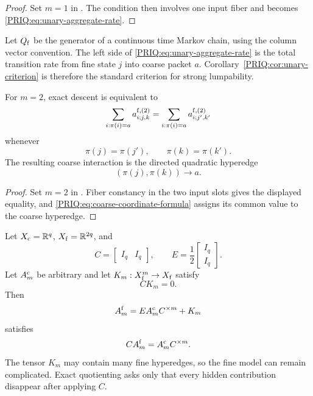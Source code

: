 \begin{proof}
Set $m=1$ in .  The condition then involves one input fiber and becomes \eqref{PRIQ:eq:unary-aggregate-rate}.
\end{proof}

Let $Q_{\mathrm f}$ be the generator of a continuous time Markov chain, using the column vector convention.  The left side of \eqref{PRIQ:eq:unary-aggregate-rate} is the total transition rate from fine state $j$ into coarse packet $a$.  Corollary~\ref{PRIQ:cor:unary-criterion} is therefore the standard criterion for strong lumpability.

\begin{PRIQcorollary}\label{PRIQ:cor:quadratic-criterion}
For $m=2$, exact descent is equivalent to
\[
  \sum_{i:\pi(i)=a}a^{\mathrm f,(2)}_{i;j,k}
  =
  \sum_{i:\pi(i)=a}a^{\mathrm f,(2)}_{i;j',k'}
\]
whenever
\[
  \pi(j)=\pi(j'),
  \qquad
  \pi(k)=\pi(k').
\]
The resulting coarse interaction is the directed quadratic hyperedge
\[
  (\pi(j),\pi(k))\longrightarrow a.
\]
\end{PRIQcorollary}

\begin{proof}
Set $m=2$ in .  Fiber constancy in the two input slots gives the displayed equality, and \eqref{PRIQ:eq:coarse-coordinate-formula} assigns its common value to the coarse hyperedge.
\end{proof}

\begin{PRIQexample}\label{PRIQ:ex:invisible-interactions}
Let $X_{\mathrm c}=\mathbb R^q$, $X_{\mathrm f}=\mathbb R^{2q}$, and
\[
  C=\begin{bmatrix}I_q&I_q\end{bmatrix},
  \qquad
  E=\frac12\begin{bmatrix}I_q\\I_q\end{bmatrix}.
\]
Let $A_m^{\mathrm c}$ be arbitrary and let $K_m:X_{\mathrm f}^m\to X_{\mathrm f}$ satisfy
\[
  CK_m=0.
\]
Then
\begin{equation}\label{PRIQ:eq:exact-lift-construction}
  A_m^{\mathrm f}
  =
  EA_m^{\mathrm c}C^{\times m}+K_m
\end{equation}
satisfies
\[
  CA_m^{\mathrm f}=A_m^{\mathrm c}C^{\times m}.
\]
The tensor $K_m$ may contain many fine hyperedges, so the fine model can remain complicated.  Exact quotienting asks only that every hidden contribution disappear after applying $C$.
\end{PRIQexample}

